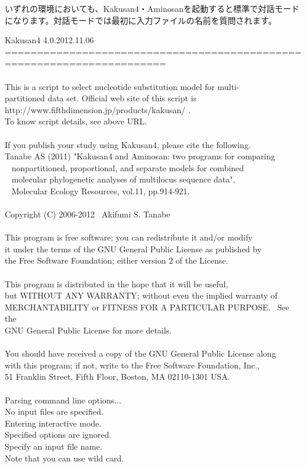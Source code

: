 \documentclass[titlepage,10pt,a4paper]{jsbook}
\newenvironment{cmd}{\begin{oframed}\raggedright\ttfamily\footnotesize\setlength{\baselineskip}{1.4em}}{\end{oframed}\vspace{-1em}}
\begin{document}
いずれの環境においても、Kakusan4・Aminosanを起動すると標準で対話モードになります。対話モードでは最初に入力ファイルの名前を質問されます。
\begin{cmd}
Kakusan4 4.0.2012.11.06\\
=======================================================================\\
~\\
This is a script to select nucleotide substitution model for multi-\\
partitioned data set. Official web site of this script is\\
http://www.fifthdimension.jp/products/kakusan/ .\\
To know script details, see above URL.\\
~\\
If you publish your study using Kakusan4, please cite the following.\\
Tanabe AS (2011) "Kakusan4 and Aminosan: two programs for comparing\\
~ nonpartitioned, proportional, and separate models for combined\\
~ molecular phylogenetic analyses of multilocus sequence data",\\
~ Molecular Ecology Resources, vol.11, pp.914-921.\\
~\\
Copyright (C) 2006-2012~ Akifumi S. Tanabe\\
~\\
This program is free software; you can redistribute it and/or modify\\
it under the terms of the GNU General Public License as published by\\
the Free Software Foundation; either version 2 of the License.\\
~\\
This program is distributed in the hope that it will be useful,\\
but WITHOUT ANY WARRANTY; without even the implied warranty of\\
MERCHANTABILITY or FITNESS FOR A PARTICULAR PURPOSE.~ See the\\
GNU General Public License for more details.\\
~\\
You should have received a copy of the GNU General Public License along\\
with this program; if not, write to the Free Software Foundation, Inc.,\\
51 Franklin Street, Fifth Floor, Boston, MA 02110-1301 USA.\\
~\\
Parsing command line options...\\
No input files are specified.\\
Entering interactive mode.\\
Specified options are ignored.\\
Specify an input file name.\\
Note that you can use wild card.
\end{cmd}
\end{document}
